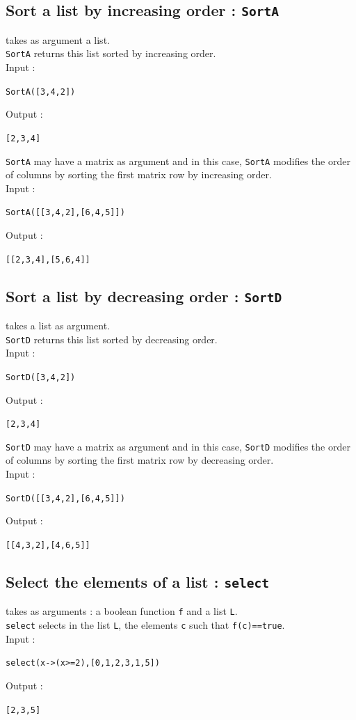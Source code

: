 \documentclass[a4paper,11pt]{book}
\begin{document}
\subsection{Sort a list by increasing order : {\tt SortA}}
 takes as argument a list.\\
{\tt SortA} returns this list sorted by increasing order.\\
Input :
\begin{center}{\tt SortA([3,4,2])}\end{center}
Output :
\begin{center}{\tt [2,3,4]}\end{center}
{\tt SortA} may have a matrix as argument and in this case, 
{\tt SortA} modifies the order of columns by sorting the first matrix
row by increasing order.\\
Input :
\begin{center}{\tt SortA([[3,4,2],[6,4,5]])}\end{center}
Output :
\begin{center}{\tt [[2,3,4],[5,6,4]]}\end{center}

\subsection{Sort a list by decreasing order : {\tt SortD}}
 takes a list as argument.\\
{\tt SortD} returns this list sorted by decreasing order.\\
Input :
\begin{center}{\tt SortD([3,4,2])}\end{center}
Output :
\begin{center}{\tt [2,3,4]}\end{center}
{\tt SortD} may have a matrix as argument and in this case, 
{\tt SortD} modifies the order of columns by sorting the first matrix
row by decreasing order.\\
Input :
\begin{center}{\tt SortD([[3,4,2],[6,4,5]])}\end{center}
Output :
\begin{center}{\tt [[4,3,2],[4,6,5]]}\end{center}

\subsection{Select the elements of a list : {\tt select}}
 takes as arguments : a boolean function {\tt f}
 and a list {\tt L}.\\
{\tt select} selects in the list {\tt L}, the elements {\tt c} such that
{\tt f(c)==true}.\\
Input :
\begin{center}{\tt select(x->(x>=2),[0,1,2,3,1,5])}\end{center}
Output :
\begin{center}{\tt  [2,3,5]}\end{center}
\end{document}
